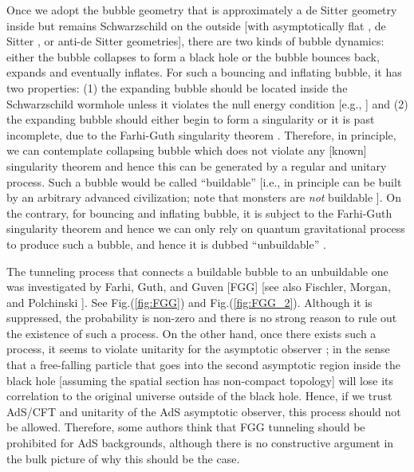 \documentclass[12pt]{article}
\newcommand{\2}{$^2$}
\newcommand{\3}{$^3$}
\newcommand{\4}{$_4$}
\newcommand{\5}{$_5$}
\begin{document}
Once we adopt the bubble geometry that is approximately a de Sitter geometry inside but  remains Schwarzschild on the outside [with asymptotically flat \cite{Blau:1986cw}, de Sitter \cite{Aguirre:2005nt}, or anti-de Sitter \cite{Freivogel:2005qh} geometries], there are two kinds of bubble dynamics: either the bubble collapses to form a black hole or the bubble bounces back, expands and eventually inflates. For such a bouncing and inflating bubble, it has two properties: (1) the expanding bubble should be located inside the Schwarzschild wormhole \cite{Blau:1986cw} unless it violates the null energy condition [e.g., \cite{Lee:2010yd}] and (2) the expanding bubble should either begin to form a singularity or it is past incomplete, due to the Farhi-Guth singularity theorem \cite{Farhi:1986ty}. Therefore, in principle, we can contemplate collapsing bubble which does not violate any [known] singularity theorem and hence this can be generated by a regular and unitary process. Such a bubble would be called ``buildable'' [i.e., in principle can be built by an arbitrary advanced civilization; note that monsters are \emph{not} buildable \cite{hsu1, hsu2}]. On the contrary, for bouncing and inflating bubble, it is subject to the Farhi-Guth singularity theorem and hence we can only rely on quantum gravitational process to produce such a bubble, and hence it is dubbed ``unbuildable'' \cite{Freivogel:2005qh}.

The tunneling process that connects a buildable bubble to an unbuildable one was investigated by Farhi, Guth, and Guven [FGG] \cite{Farhi:1989yr} [see also Fischler, Morgan, and Polchinski \cite{FMP1, FMP2}]. See Fig.(\ref{fig:FGG}) and Fig.(\ref{fig:FGG_2}). Although it is suppressed, the probability is non-zero and there is no strong reason to rule out the existence of such a process. On the other hand, once there exists such a process, it seems to violate unitarity for the asymptotic observer \cite{Freivogel:2005qh}; in the sense that a free-falling particle that goes into the second asymptotic region inside the black hole [assuming the spatial section has non-compact topology] will lose its correlation to the original universe outside of the black hole. Hence, if we trust AdS/CFT and unitarity of the AdS asymptotic observer, this process should not be allowed. Therefore, some authors \cite{Freivogel:2005qh} think that FGG tunneling should be prohibited for AdS backgrounds, although there is no constructive argument in the bulk picture of why this should be the case.
\end{document}
